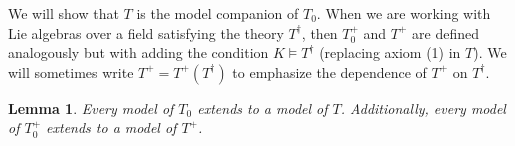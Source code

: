 \documentclass[psamsfonts]{amsart}
\newtheorem{lem}[thm]{Lemma}
\newtheorem{lemma}[thm]{Lemma}
\theoremstyle{definition}
\theoremstyle{definition}
\theoremstyle{remark}
\numberwithin{equation}{section}
\def\Th{\operatorname{Th}}
\newcommand\LL{\mathscr{L}}
\def\seq{\subseteq}
\renewcommand{\models}{\vDash}
\begin{document}
We will show that $T$ is the model companion of $T_{0}$.  When we are working with Lie algebras over a field satisfying the theory $T^{\dagger}$, then $T_{0}^{+}$ and $T^{+}$ are defined analogously but with adding the condition $K \models T^{\dagger}$ (replacing axiom (1) in $T$). We will sometimes write $T^+ = T^+(T^\dagger)$ to emphasize the dependence of $T^+$ on $T^\dagger$. 
%
%




\begin{lem}
    Every model of $T_{0}$ extends to a model of $T$.  Additionally, every model of $T_{0}^{+}$ extends to a model of $T^{+}$.  
\end{lem}
\end{document}
